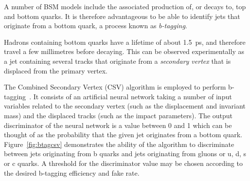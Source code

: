 


A number of BSM models include the associated production of, or decays to, top 
and bottom quarks. It is therefore advantageous to be able to identify jets 
that originate from a bottom quark, a process known as \textit{b-tagging}.

Hadrons containing bottom quarks have a lifetime of about 1.5~ps, and therefore 
travel a few millimetres before decaying. This can be observed experimentally 
as a jet containing several tracks that originate from a \textit{secondary 
vertex} that is displaced from the primary vertex.

The Combined Secondary Vertex (CSV) algorithm is employed to perform 
b-tagging~\cite{btagging}. It consists of an artificial neural network taking a 
number of input variables related to the secondary vertex (such as the 
displacement and invariant mass) and the displaced tracks (such as the impact 
parameters). The output discriminator of the neural network is a value between 
0 and 1 which can be thought of as the probability that the given jet 
originates from a bottom quark. Figure~\ref{fig:btagcsv} demonstrates the 
ability of the algorithm to discriminate between jets originating from b quarks 
and jets originating from gluons or u, d, s or c quarks. A threshold for the 
discriminator value may be chosen according to the desired b-tagging efficiency 
and fake rate.

